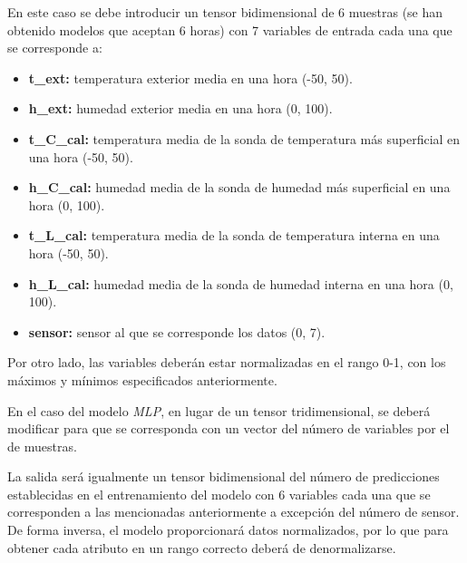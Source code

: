 En este caso se debe introducir un tensor bidimensional de 6 muestras (se han obtenido modelos que aceptan 6 horas) con 7 variables de entrada cada una que se corresponde a:
\begin{itemize}
    \item \textbf{t\_ext:} temperatura exterior media en una hora (-50, 50).
    \item \textbf{h\_ext:} humedad exterior media en una hora (0, 100).
    \item \textbf{t\_C\_cal:} temperatura media de la sonda de temperatura más superficial en una hora (-50, 50).
    \item \textbf{h\_C\_cal:} humedad media de la sonda de humedad más superficial en una hora (0, 100).
    \item \textbf{t\_L\_cal:} temperatura media de la sonda de temperatura interna en una hora (-50, 50).
    \item \textbf{h\_L\_cal:} humedad media de la sonda de humedad interna en una hora (0, 100).
    \item \textbf{sensor:} sensor al que se corresponde los datos (0, 7).
\end{itemize}

Por otro lado, las variables deberán estar normalizadas en el rango 0-1, con los máximos y mínimos especificados anteriormente.

En el caso del modelo \textit{MLP}, en lugar de un tensor tridimensional, se deberá modificar para que se corresponda con un vector del número de variables por el de muestras.

La salida será igualmente un tensor bidimensional del número de predicciones establecidas en el entrenamiento del modelo con 6 variables cada una que se corresponden a las mencionadas
anteriormente a excepción del número de sensor. De forma inversa, el modelo proporcionará datos normalizados, por lo que para obtener cada atributo en un rango correcto deberá de denormalizarse.